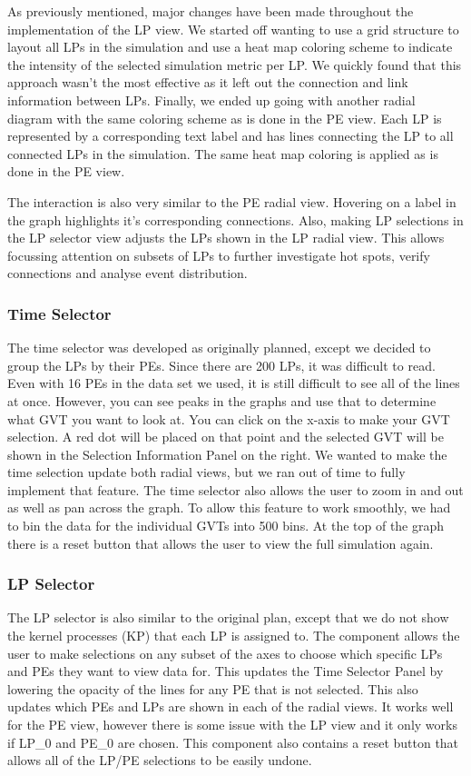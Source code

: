 \documentclass{acm_proc_article-sp}
\begin{document}
As previously mentioned, major changes have been made throughout the implementation of the LP view. We started off wanting to use a grid structure to layout all LPs in the simulation and use a heat map coloring scheme to indicate the intensity of the selected simulation metric per LP. We quickly found that this approach wasn't the most effective as it left out the connection and link information between LPs. Finally, we ended up going with another radial diagram with the same coloring scheme as is done in the PE view. Each LP is represented by a corresponding text label and has lines connecting the LP to all connected LPs in the simulation. The same heat map coloring is applied as is done in the PE view. 

The interaction is also very similar to the PE radial view. Hovering on a label in the graph highlights it's corresponding connections. Also, making LP selections in the LP selector view adjusts the LPs shown in the LP radial view. This allows focussing attention on subsets of LPs to further investigate hot spots, verify connections and analyse event distribution.

\subsubsection{Time Selector}
The time selector was developed as originally planned, except we decided to group the LPs by their PEs.  Since there are 200 LPs, it was difficult to read.  Even with 16 PEs in the data set we used, it is still difficult to see all of the lines at once.  However, you can see peaks in the graphs and use that to determine what GVT you want to look at.  You can click on the x-axis to make your GVT selection.  A red dot will be placed on that point and the selected GVT will be shown in the Selection Information Panel on the right.  We wanted to make the time selection update both radial views, but we ran out of time to fully implement that feature.  The time selector also allows the user to zoom in and out as well as pan across the graph.  To allow this feature to work smoothly, we had to bin the data for the individual GVTs into 500 bins.  At the top of the graph there is a reset button that allows the user to view the full simulation again.

\subsubsection{LP Selector}
The LP selector is also similar to the original plan, except that we do not show the kernel processes (KP) that each LP is assigned to.  The component allows the user to make selections on any subset of the axes to choose which specific LPs and PEs they want to view data for.  This updates the Time Selector Panel by lowering the opacity of the lines for any PE that is not selected.  This also updates which PEs and LPs are shown in each of the radial views.  It works well for the PE view, however there is some issue with the LP view and it only works if LP\_0 and PE\_0 are chosen.  This component also contains a reset button that allows all of the LP/PE selections to be easily undone.  
\end{document}
